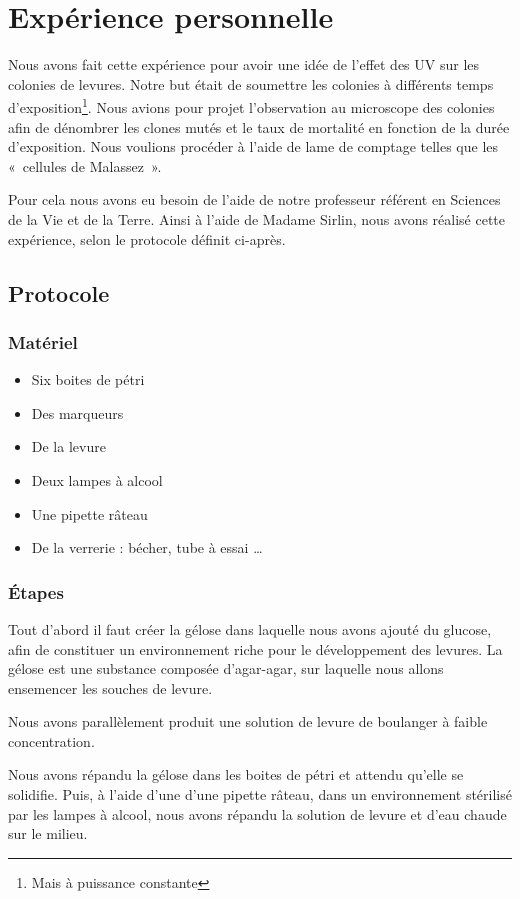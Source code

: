 \section{Expérience personnelle}
Nous avons fait cette expérience pour avoir une idée de l'effet des UV sur les colonies de levures. 
Notre but était de soumettre les colonies à différents temps d'exposition\footnote{Mais à puissance constante}. 
Nous avions pour projet l'observation au microscope des colonies afin de dénombrer les clones mutés et le 
taux de mortalité en fonction de la durée d'exposition.
Nous voulions procéder à l'aide de lame de comptage telles que les «~cellules de Malassez~».

Pour cela nous avons eu besoin de l'aide de notre professeur référent en Sciences de la Vie et de la Terre.
Ainsi à l'aide de Madame Sirlin, nous avons réalisé cette expérience, selon le protocole définit ci-après.

\subsection{Protocole}
  \subsubsection{Matériel}
    \begin{itemize}
      \item Six boites de pétri
      \item Des marqueurs
      \item De la levure
      \item Deux lampes à alcool
      \item Une pipette râteau
      \item De la verrerie : bécher, tube à essai …
    \end{itemize}
  \subsubsection{Étapes}
    Tout d'abord il faut créer la gélose dans laquelle nous avons ajouté du glucose, afin de constituer un environnement riche pour le développement des levures. La gélose est une substance composée d'agar-agar, sur laquelle nous allons ensemencer les souches de levure.
    
    Nous avons parallèlement produit une solution de levure de boulanger à faible concentration. 
    
    Nous avons répandu la gélose dans les boites de pétri et attendu qu'elle se solidifie. Puis, à l'aide d'une d'une pipette râteau, dans un environnement stérilisé par les lampes à alcool, nous avons répandu la solution de levure et d'eau chaude sur le milieu. 
    
